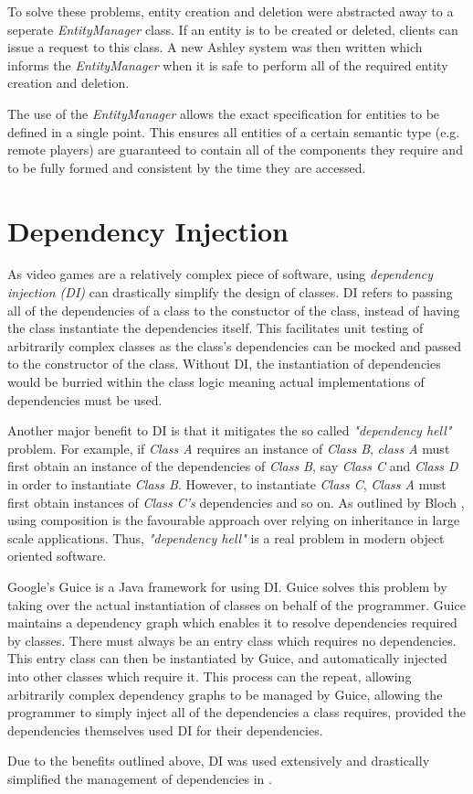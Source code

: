 To solve these problems, entity creation and deletion were abstracted away to a seperate \textit{EntityManager} class. If an entity is to be created or deleted, clients can issue a request to this class. A new Ashley system was then written which informs the \textit{EntityManager} when it is safe to perform all of the required entity creation and deletion.

The use of the \textit{EntityManager} allows the exact specification for entities to be defined in a single point. This ensures all entities of a certain semantic type (e.g. remote players) are guaranteed to contain all of the components they require and to be fully formed and consistent by the time they are accessed. 

\section{Dependency Injection}
As video games are a relatively complex piece of software, using \textit{dependency injection (DI)} can drastically simplify the design of classes. DI refers to passing all of the dependencies of a class to the constuctor of the class, instead of having the class instantiate the dependencies itself. This facilitates unit testing of arbitrarily complex classes as the class's dependencies can be mocked and passed to the constructor of the class. Without DI, the instantiation of dependencies would be burried within the class logic meaning actual implementations of dependencies must be used.

Another major benefit to DI is that it mitigates the so called \textit{"dependency hell"} problem. For example, if \textit{Class A} requires an instance of \textit{Class B}, \textit{class A} must first obtain an instance of the dependencies of \textit{Class B}, say \textit{Class C} and \textit{Class D} in order to instantiate \textit{Class B}. However, to instantiate \textit{Class C}, \textit{Class A} must first obtain instances of \textit{Class C's} dependencies and so on. As outlined by Bloch \cite{effecitve-java}, using composition is the favourable approach over relying on inheritance in large scale applications. Thus, \textit{"dependency hell"} is a real problem in modern object oriented software.

Google's Guice \cite{guice} is a Java framework for using DI. Guice solves this problem by taking over the actual instantiation of classes on behalf of the programmer. Guice maintains a dependency graph which enables it to resolve dependencies required by classes. There must always be an entry class which requires no dependencies. This entry class can then be instantiated by Guice, and automatically injected into other classes which require it. This process can the repeat, allowing arbitrarily complex dependency graphs to be managed by Guice, allowing the programmer to simply inject all of the dependencies a class requires, provided the dependencies themselves used DI for their dependencies.

Due to the benefits outlined above, DI was used extensively and drastically simplified the management of dependencies in \game{}.